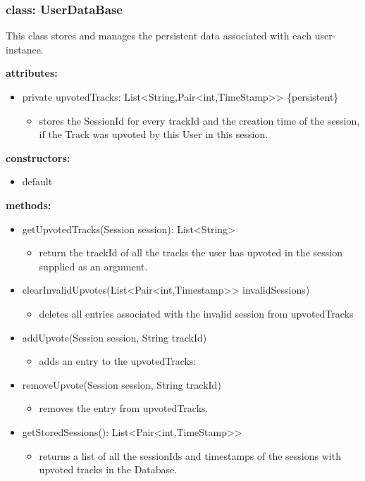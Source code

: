 \documentclass[oneside, ngerman]{sdqtechreport}
\begin{document}
\subsubsection{class: UserDataBase}
This class stores and manages the persistent data associated with each user-instance.

\textbf{attributes:}
\begin{itemize}
    \item private upvotedTracks: List<String,Pair<int,TimeStamp>> \{persistent\}
    \begin{itemize}
        \item stores the SessionId for every trackId  and the creation time of the session, if the Track was upvoted by this User in this session.
    \end{itemize}
\end{itemize}
\textbf{constructors:}
\begin{itemize}
    \item default
\end{itemize}
\textbf{methods:}
\begin{itemize}
    \item getUpvotedTracks(Session session): List<String>
    \begin{itemize}
        \item return the trackId of all the tracks the user has upvoted in the session supplied as an argument.
    \end{itemize}
    \item clearInvalidUpvotes(List<Pair<int,Timestamp>> invalidSessions)
    \begin{itemize}
        \item deletes all entries associated with the invalid session from upvotedTracks
    \end{itemize}
    \item addUpvote(Session session, String trackId)
    \begin{itemize}
        \item adds an entry to the upvotedTracks:
    \end{itemize}
    \item removeUpvote(Session session, String trackId)
    \begin{itemize}
        \item removes the entry from upvotedTracks.
    \end{itemize}
    \item getStoredSessions(): List<Pair<int,TimeStamp>>
    \begin{itemize}
        \item returns a list of all the sessionIds and timestamps of the sessions with upvoted tracks in the Database.
    \end{itemize}
\end{itemize}
\end{document}
